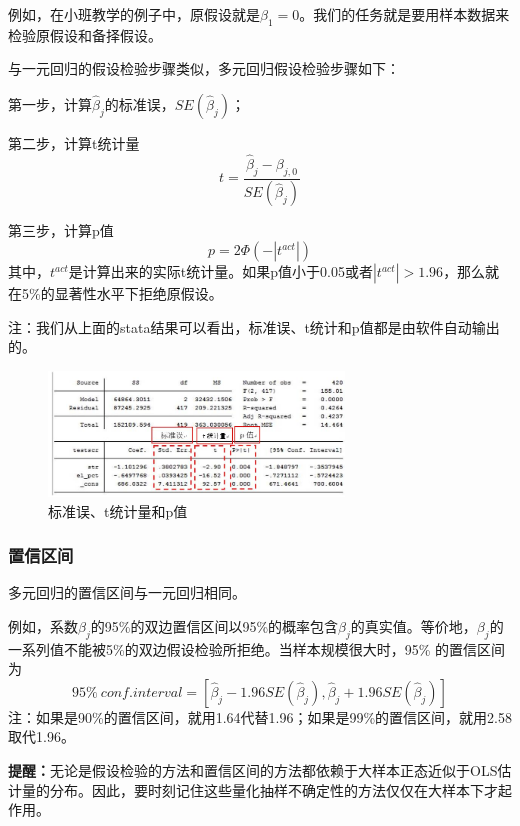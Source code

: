 \documentclass[cn,12pt,math=newtx,citestyle=gb7714-2015,bibstyle=gb7714-2015]{elegantbook}
\begin{document}
	例如，在小班教学的例子中，原假设就是$\beta_1=0$。我们的任务就是要用样本数据来检验原假设和备择假设。
	
	与一元回归的假设检验步骤类似，多元回归假设检验步骤如下：
	
	第一步，计算$\hat{\beta}_j$的标准误，$SE(\hat{\beta}_j)$；
	
	第二步，计算t统计量
	\begin{equation}
		t=\frac{\hat{\beta}_j-\beta_{j,0}}{SE(\hat{\beta}_j)}
	\end{equation}
	
	第三步，计算p值
	\begin{equation}
		p=2\Phi(-|t^{act}|)
	\end{equation}
	其中，$t^{act}$是计算出来的实际t统计量。如果p值小于0.05或者$|t^{act}|>1.96$，那么就在5\%的显著性水平下拒绝原假设。
	
	注：我们从上面的stata结果可以看出，标准误、t统计和p值都是由软件自动输出的。
	\begin{figure}[htbp]
		\centering
		\includegraphics[width=0.7\textwidth]{SE.jpg}
		\caption{标准误、t统计量和p值}\label{fig:digit}
	\end{figure}
	
	\subsubsection{置信区间}
	多元回归的置信区间与一元回归相同。
	
	例如，系数$\beta_j$的95\%的双边置信区间以95\%的概率包含$\beta_j$的真实值。等价地，$\beta_j$的一系列值不能被5\%的双边假设检验所拒绝。当样本规模很大时，95\% 的置信区间为
	\begin{equation}
		95\%~conf. interval=[\hat{\beta}_j-1.96SE(\hat{\beta}_j),\hat{\beta}_j+1.96SE(\hat{\beta}_j)]
	\end{equation}
	注：如果是90\%的置信区间，就用1.64代替1.96；如果是99\%的置信区间，就用2.58取代1.96。
	
	\textbf{提醒：}无论是假设检验的方法和置信区间的方法都依赖于大样本正态近似于OLS估计量的分布。因此，要时刻记住这些量化抽样不确定性的方法仅仅在大样本下才起作用。
	
\end{document}
